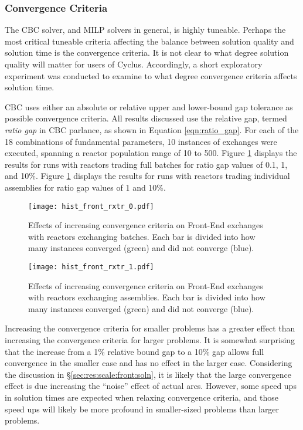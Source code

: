 \subsubsection{Convergence Criteria}

The CBC solver, and MILP solvers in general, is highly tuneable. Perhaps the
most critical tuneable criteria affecting the balance between solution quality
and solution time is the convergence criteria. It is not clear to what degree
solution quality will matter for users of Cyclus. Accordingly, a short
exploratory experiment was conducted to examine to what degree convergence
criteria affects solution time.

CBC uses either an absolute or relative upper and lower-bound gap tolerance as
possible convergence criteria. All results discussed use the relative gap,
termed \textit{ratio gap} in CBC parlance, as shown in Equation
\ref{eqn:ratio_gap}. For each of the 18 combinations of fundamental parameters,
10 instances of exchanges were executed, spanning a reactor population range of
10 to 500. Figure \ref{fig:hist_front_rxtr_0} displays the results for runs with
reactors trading full batches for ratio gap values of 0.1, 1, and 10\%. Figure
\ref{fig:hist_front_rxtr_0} displays the results for runs with reactors trading
individual assemblies for ratio gap values of 1 and 10\%.

\begin{figure}[h!]
  \begin{center}
    \texttt{[image: hist\_front\_rxtr\_0.pdf]}
    \caption[]{
      \label{fig:hist_front_rxtr_0}
      Effects of increasing convergence criteria on Front-End exchanges with
      reactors exchanging batches. Each bar is divided into how many instances
      converged (green) and did not converge (blue). }
  \end{center}
\end{figure}

\begin{figure}[h!]
  \begin{center}
    \texttt{[image: hist\_front\_rxtr\_1.pdf]}
    \caption[]{
      \label{fig:hist_front_rxtr_1}
      Effects of increasing convergence criteria on Front-End exchanges with
      reactors exchanging assemblies. Each bar is divided into how many instances
      converged (green) and did not converge (blue).}
  \end{center}
\end{figure}

Increasing the convergence criteria for smaller problems has a greater effect
than increasing the convergence criteria for larger problems. It is somewhat
surprising that the increase from a 1\% relative bound gap to a 10\% gap allows
full convergence in the smaller case and has no effect in the larger
case. Considering the discussion in \S \ref{sec:res:scale:front:soln}, it is
likely that the large convergence effect is due increasing the ``noise'' effect
of actual arcs. However, some speed ups in solution times are expected when
relaxing convergence criteria, and those speed ups will likely be more profound
in smaller-sized problems than larger problems.


